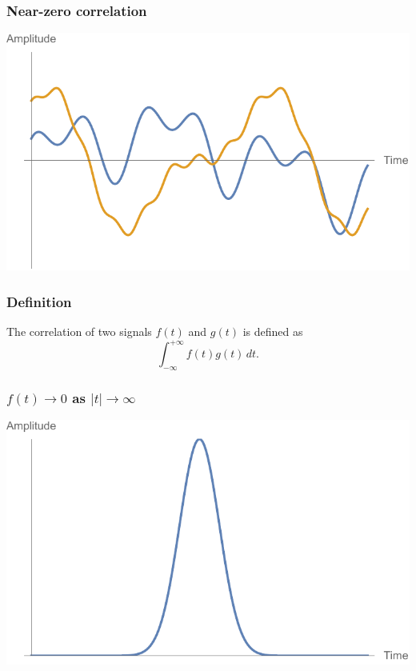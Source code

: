 \documentclass[aspectratio=169]{beamer}
\begin{document}
\begin{frame}
    \frametitle{Near-zero correlation}

    \centering
    \includegraphics[width=\textwidth * 3 / 4]{3 zero.pdf}
\end{frame}

\begin{frame}
  \frametitle{Definition}

  The correlation of two signals $f(t)$ and $g(t)$ is defined as \[\int_{-\infty}^{+\infty} f(t) g(t) \,dt.\]
\end{frame}

\begin{frame}
  \frametitle{$f(t) \rightarrow 0$ as $|t| \rightarrow \infty$}

  \centering
  \includegraphics[width=\textwidth * 3 / 4]{4 square integrable.pdf}
\end{frame}
\end{document}
